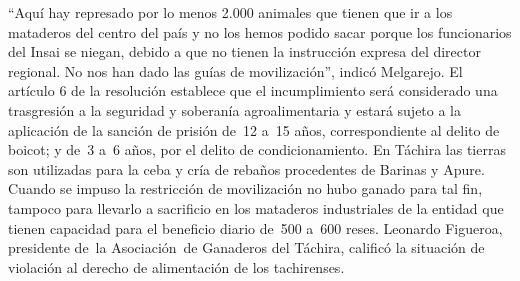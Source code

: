 \documentclass{article}%
\begin{document}
\newline%
%
“Aquí hay represado por lo menos 2.000 animales que tienen que ir a los mataderos del centro del país y no los hemos podido sacar porque los funcionarios del Insai se niegan, debido a que no tienen la instrucción expresa del director regional. No nos han dado las guías de movilización”, indicó Melgarejo.%
\newline%
%
El artículo 6 de la resolución establece que el incumplimiento será considerado una trasgresión a la seguridad y soberanía agroalimentaria y estará sujeto a la aplicación de la sanción de prisión de~12 a~15 años, correspondiente al delito de boicot; y de~3 a~6 años, por el delito de condicionamiento.%
\newline%
%
En Táchira las tierras son utilizadas para la ceba y cría de rebaños procedentes de Barinas y Apure. Cuando se impuso la restricción de movilización no hubo ganado para tal fin, tampoco para llevarlo a sacrificio en los mataderos industriales de la entidad que tienen capacidad para el beneficio diario de~500 a~600 reses.%
\newline%
%
Leonardo Figueroa, presidente de~la Asociación~de Ganaderos del Táchira, calificó la situación de violación al derecho de alimentación de los tachirenses.%
\newline%
%
\end{document}
